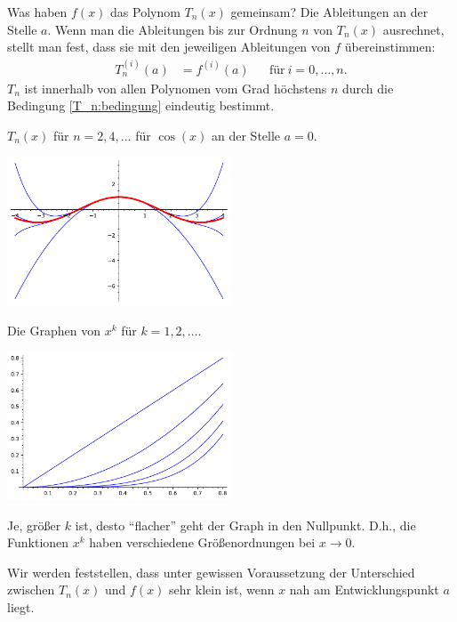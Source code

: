 \begin{bem}
	Was haben $f(x)$ das Polynom $T_n(x)$ gemeinsam? Die Ableitungen an der Stelle $a$. Wenn man die Ableitungen bis zur Ordnung $n$ von $T_n(x)$ ausrechnet, stellt man fest, dass sie mit den jeweiligen Ableitungen von $f$ übereinstimmen: 
	\begin{align} \label{T_n:bedingung} 
		T_n^{(i)}(a) & = f^{(i)}(a)  & & \text{für} \ i=0,\ldots,n.
	\end{align} 
	$T_n$ ist innerhalb von allen Polynomen vom Grad höchstens $n$ durch die Bedingung \eqref{T_n:bedingung} eindeutig bestimmt. 
\end{bem} 

\begin{bem}
	$T_n(x)$ für $n=2,4,\ldots$ für $\cos(x)$ an der Stelle $a=0$. 
	\begin{center}
	\includegraphics[width=0.5\textwidth]{pics/taylor_cos.pdf}
\end{center} 
\end{bem} 

\begin{bem}
	Die Graphen von $x^k$ für $k=1,2,\ldots$. 
	\begin{center}
		\includegraphics[width=0.5\textwidth]{pics/powers.pdf}
	\end{center} 
	Je, größer $k$ ist, desto ``flacher'' geht der Graph in den Nullpunkt. D.h., die Funktionen $x^k$ haben verschiedene Größenordnungen bei $x \to 0$. 
\end{bem} 


\begin{bem}
	Wir werden feststellen, dass unter gewissen Voraussetzung der Unterschied zwischen $T_n(x)$ und $f(x)$ sehr klein ist, wenn $x$ nah am Entwicklungspunkt $a$ liegt. 
\end{bem} 

